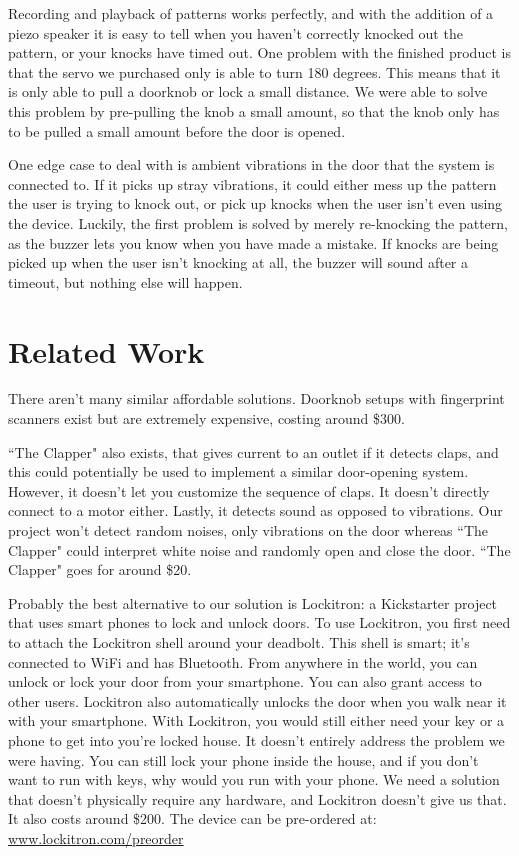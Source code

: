 \documentclass[11pt]{article}			%
\begin{document}
Recording and playback of patterns works perfectly, and with the addition of a piezo speaker it is easy to tell when you haven't correctly knocked out the pattern, or your knocks have timed out.  One problem with the finished product is that the servo we purchased only is able to turn 180 degrees.  This means that it is only able to pull a doorknob or lock a small distance.  We were able to solve this problem by pre-pulling the knob a small amount, so that the knob only has to be pulled a small amount before the door is opened.

One edge case to deal with is ambient vibrations in the door that the system is connected to.  If it picks up stray vibrations, it could either mess up the pattern the user is trying to knock out, or pick up knocks when the user isn't even using the device.  Luckily, the first problem is solved by merely re-knocking the pattern, as the buzzer lets you know when you have made a mistake.  If knocks are being picked up when the user isn't knocking at all, the buzzer will sound after a timeout, but nothing else will happen.

\section{Related Work}
There aren't many similar affordable solutions. Doorknob setups with fingerprint scanners exist but are extremely expensive, costing around \$300.

``The Clapper" also exists, that gives current to an outlet if it detects claps, and this could potentially be used to implement a similar door-opening system. However, it doesn't let you customize the sequence of claps. It doesn't directly connect to a motor either. Lastly, it detects sound as opposed to vibrations. Our project won't detect random noises, only vibrations on the door whereas ``The Clapper" could interpret white noise and randomly open and close the door. ``The Clapper" goes for around \$20. 

Probably the best alternative to our solution is Lockitron: a Kickstarter project that uses smart phones to lock and unlock doors. To use Lockitron, you first need to attach the Lockitron shell around your deadbolt. This shell is smart; it's connected to WiFi and has Bluetooth. From anywhere in the world, you can unlock or lock your door from your smartphone. You can also grant access to other users. Lockitron also automatically unlocks the door when you walk near it with your smartphone. With Lockitron, you would still either need your key or a phone to get into you're locked house. It doesn't entirely address the problem we were having. You can still lock your phone inside the house, and if you don't want to run with keys, why would you run with your phone. We need a solution that doesn't physically require any hardware, and Lockitron doesn't give us that. It also costs around \$200. The device can be pre-ordered at: \url{www.lockitron.com/preorder}
\end{document}
